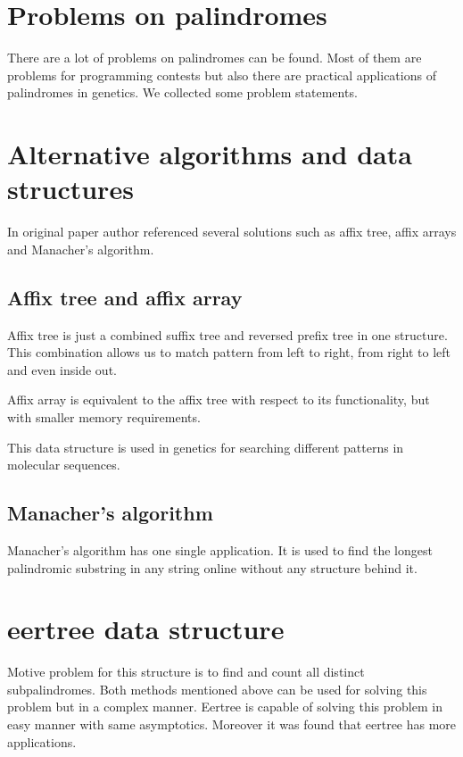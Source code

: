 \section{Problems on palindromes}

There are a lot of problems on palindromes can be found. Most of them are problems for programming contests but also there are practical applications of palindromes in genetics. We collected some problem statements.



\section{Alternative algorithms and data structures}

In original paper \cite{RUBINCHIK2018249} author referenced several solutions such as affix tree, affix arrays and Manacher's algorithm.

\subsection{Affix tree and affix array}

Affix tree\cite{stoye2000affix} is just a combined suffix tree and reversed prefix tree in one structure. This combination allows us to match pattern from left to right, from right to left and even inside out.

Affix array\cite{strothmann2007affix} is equivalent to the affix tree with respect to
its functionality, but with smaller memory requirements.

This data structure is used in genetics for searching different patterns in molecular sequences.

\subsection{Manacher's algorithm}

Manacher's algorithm\cite{manacher1975new} has one single application. It is used to find the longest palindromic substring in any string online without any structure behind it.


\section{eertree data structure}

Motive problem for this structure is to find and count all
distinct subpalindromes. Both methods mentioned above can be used for solving this problem but in a complex manner. Eertree is capable of solving this problem in easy manner with same asymptotics. Moreover it was found that eertree has more applications.

